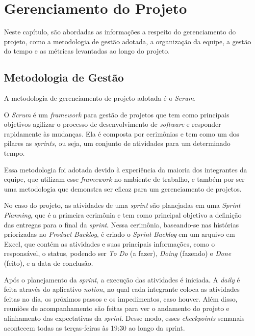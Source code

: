 \chapter{Gerenciamento do Projeto}
Neste capítulo, são abordadas as informações a respeito do gerenciamento do projeto, como a metodologia de gestão adotada, a organização da equipe, a gestão do tempo e as métricas levantadas ao longo do projeto.

\section{Metodologia de Gestão}
A metodologia de gerenciamento de projeto adotada é o \textit{Scrum}.

O \textit{Scrum} é um \textit{\gls{framework}} para gestão de projetos que tem como principais objetivos agilizar o processo de desenvolvimento de \textit{\gls{software}} e responder rapidamente às mudanças. Ela é composta por cerimônias e tem como um dos pilares as \textit{\glspl{sprint}}, ou seja, um conjunto de atividades para um determinado tempo. 

Essa metodologia foi adotada devido à experiência da maioria dos integrantes da equipe, que utilizam esse \textit{\gls{framework}} no ambiente de trabalho, e também por ser uma metodologia que demonstra ser eficaz para um gerenciamento de projetos.


No caso do projeto, as atividades de uma \textit{\gls{sprint}} são planejadas em uma \textit{Sprint Planning}, que é a primeira cerimônia e tem como principal objetivo a definição das entregas para o final da \textit{\gls{sprint}}. Nessa cerimônia, baseando-se nas histórias priorizadas no \textit{Product Backlog}, é criado o \textit{Sprint Backlog} em um arquivo em Excel, que contém as atividades e suas principais informações, como o responsável, o status, podendo ser \textit{To Do} (a fazer), \textit{Doing} (fazendo) e \textit{Done} (feito), e a data de conclusão. 


Após o planejamento da \textit{\gls{sprint}}, a execução das atividades é iniciada. A \textit{\gls{daily}} é feita através do aplicativo \textit{\gls{notion}}, no qual cada integrante coloca as atividades feitas no dia, os próximos passos e os impedimentos, caso houver. Além disso, reuniões de acompanhamento são feitas para ver o andamento do projeto e alinhamento das expectativas da \textit{\gls{sprint}}. Desse modo, esses \textit{\glspl{checkpoint}} semanais acontecem todas as terças-feiras às 19:30 ao longo da sprint. 

